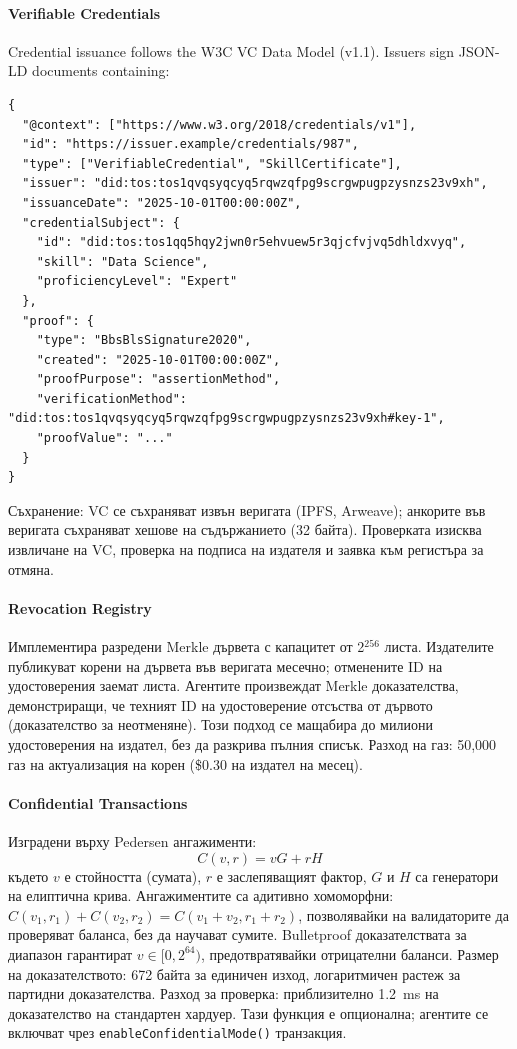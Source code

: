 \documentclass[11pt]{article}
\begin{document}
\paragraph{Verifiable Credentials} Credential issuance follows the W3C VC Data Model (v1.1). Issuers sign JSON-LD documents containing:
\begin{verbatim}
{
  "@context": ["https://www.w3.org/2018/credentials/v1"],
  "id": "https://issuer.example/credentials/987",
  "type": ["VerifiableCredential", "SkillCertificate"],
  "issuer": "did:tos:tos1qvqsyqcyq5rqwzqfpg9scrgwpugpzysnzs23v9xh",
  "issuanceDate": "2025-10-01T00:00:00Z",
  "credentialSubject": {
    "id": "did:tos:tos1qq5hqy2jwn0r5ehvuew5r3qjcfvjvq5dhldxvyq",
    "skill": "Data Science",
    "proficiencyLevel": "Expert"
  },
  "proof": {
    "type": "BbsBlsSignature2020",
    "created": "2025-10-01T00:00:00Z",
    "proofPurpose": "assertionMethod",
    "verificationMethod": "did:tos:tos1qvqsyqcyq5rqwzqfpg9scrgwpugpzysnzs23v9xh#key-1",
    "proofValue": "..."
  }
}
\end{verbatim}
Съхранение: VC се съхраняват извън веригата (IPFS, Arweave); анкорите във веригата съхраняват хешове на съдържанието (32 байта). Проверката изисква извличане на VC, проверка на подписа на издателя и заявка към регистъра за отмяна.

\paragraph{Revocation Registry} Имплементира разредени Merkle дървета с капацитет от 2$^{256}$ листа. Издателите публикуват корени на дървета във веригата месечно; отменените ID на удостоверения заемат листа. Агентите произвеждат Merkle доказателства, демонстриращи, че техният ID на удостоверение отсъства от дървото (доказателство за неотменяне). Този подход се мащабира до милиони удостоверения на издател, без да разкрива пълния списък. Разход на газ: 50,000 газ на актуализация на корен (\$0.30 на издател на месец).

\paragraph{Confidential Transactions} Изградени върху Pedersen ангажименти:
\begin{equation}
C(v, r) = vG + rH
\end{equation}
където $v$ е стойността (сумата), $r$ е заслепяващият фактор, $G$ и $H$ са генератори на елиптична крива. Ангажиментите са адитивно хомоморфни: $C(v_1, r_1) + C(v_2, r_2) = C(v_1 + v_2, r_1 + r_2)$, позволявайки на валидаторите да проверяват баланса, без да научават сумите. Bulletproof доказателствата за диапазон гарантират $v \in [0, 2^{64})$, предотвратявайки отрицателни баланси. Размер на доказателството: 672 байта за единичен изход, логаритмичен растеж за партидни доказателства. Разход за проверка: приблизително 1.2~ms на доказателство на стандартен хардуер. Тази функция е опционална; агентите се включват чрез \texttt{enableConfidentialMode()} транзакция.
\end{document}
